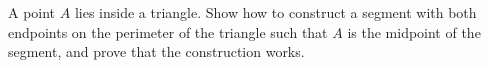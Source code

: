 A point $A$ lies inside a triangle. Show how to construct a segment with both endpoints on the perimeter of the triangle such that $A$ is the midpoint of the segment, and prove that the construction works.
